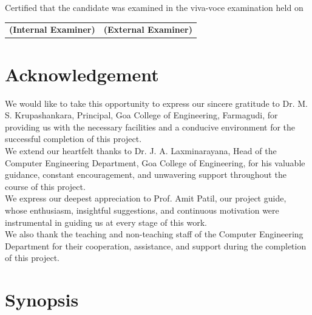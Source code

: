 \documentclass[12pt,a4paper]{report}
\begin{document}
Certified that the candidate was examined in the viva-voce examination held on \dotfill

\vspace{1.7cm}

\begin{tabular}{p{} p{}}
\textbf{(Internal Examiner)} & \hfill \textbf{(External Examiner)}
\end{tabular}

\newpage

\tableofcontents
\newpage

\chapter*{Acknowledgement}

We would like to take this opportunity to express our sincere gratitude to 
Dr. M. S. Krupashankara, Principal, Goa College of Engineering, Farmagudi, 
for providing us with the necessary facilities and a conducive environment 
for the successful completion of this project.\\[0.1cm]

We extend our heartfelt thanks to Dr. J. A. Laxminarayana, Head of the 
Computer Engineering Department, Goa College of Engineering, for his 
valuable guidance, constant encouragement, and unwavering support 
throughout the course of this project.\\[0.1cm]

We express our deepest appreciation to Prof. Amit Patil, our project guide, 
whose enthusiasm, insightful suggestions, and continuous motivation were 
instrumental in guiding us at every stage of this work.\\[0.1cm]

We also thank the teaching and non-teaching staff of the Computer Engineering 
Department for their cooperation, assistance, and support during the 
completion of this project.

\chapter*{Synopsis}
\end{document}
